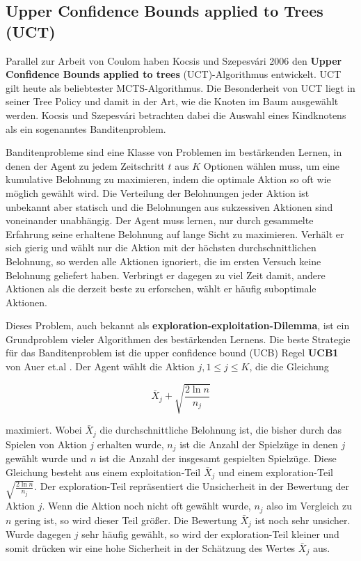 \subsection{Upper Confidence Bounds applied to Trees (UCT)}

Parallel zur Arbeit von Coulom haben Kocsis und Szepesv\'{a}ri 2006 den \textbf{Upper Confidence Bounds applied to trees} (UCT)-Algorithmus \autocite{kocsisBanditBasedMonteCarlo2006} entwickelt. UCT gilt heute als beliebtester MCTS-Algorithmus. Die Besonderheit von UCT liegt in seiner Tree Policy und damit in der Art, wie die Knoten im Baum ausgewählt werden. Kocsis und Szepesv\'{a}ri betrachten dabei die Auswahl eines Kindknotens als ein sogenanntes Banditenproblem. \autocite[\ppno~25\psqq]{suttonReinforcementLearningIntroduction2018}

\bigskip
Banditenprobleme sind eine Klasse von Problemen im bestärkenden Lernen, in denen der Agent zu jedem Zeitschritt $t$ aus $K$ Optionen wählen muss, um eine kumulative Belohnung zu maximieren, indem die optimale Aktion so oft wie möglich gewählt wird. Die Verteilung der Belohnungen jeder Aktion ist unbekannt aber statisch und die Belohnungen aus sukzessiven Aktionen sind voneinander unabhängig. Der Agent muss lernen, nur durch gesammelte Erfahrung seine erhaltene Belohnung auf lange Sicht zu maximieren. Verhält er sich gierig und wählt nur die Aktion mit der höchsten durchschnittlichen Belohnung, so werden alle Aktionen ignoriert, die im ersten Versuch keine Belohnung geliefert haben. Verbringt er dagegen zu viel Zeit damit, andere Aktionen als die derzeit beste zu erforschen, wählt er häufig suboptimale Aktionen. 

Dieses Problem, auch bekannt als \textbf{exploration-exploitation-Dilemma}, ist ein Grundproblem vieler Algorithmen des bestärkenden Lernens. Die beste Strategie für das Banditenproblem ist die upper confidence bound (UCB) Regel \textbf{UCB1} von Auer et.al \autocite[\ppno~237]{auerFinitetimeAnalysisMultiarmed2002}. Der Agent wählt die Aktion $j, 1 \le j \le K$, die die Gleichung

\begin{equation}
\bar{X}_j + \sqrt{\frac{2\ln n}{n_j}}
\label{eqn:UCB1}
\end{equation}

maximiert. Wobei $\bar{X}_j$ die durchschnittliche Belohnung ist, die bisher durch das Spielen von Aktion $j$ erhalten wurde, $n_j$ ist die Anzahl der Spielzüge in denen $j$ gewählt wurde und $n$ ist die Anzahl der insgesamt gespielten Spielzüge. Diese Gleichung besteht aus einem exploitation-Teil $\bar{X}_j$ und einem exploration-Teil $\sqrt{\frac{2\ln n}{n_j}}$. Der exploration-Teil repräsentiert die Unsicherheit in der Bewertung der Aktion $j$. Wenn die Aktion noch nicht oft gewählt wurde, $n_j$ also im Vergleich zu $n$ gering ist, so wird dieser Teil größer. Die Bewertung $\bar{X}_j$ ist noch sehr unsicher. Wurde dagegen $j$ sehr häufig gewählt, so wird der exploration-Teil kleiner und somit drücken wir eine hohe Sicherheit in der Schätzung des Wertes $\bar{X}_j$ aus.

